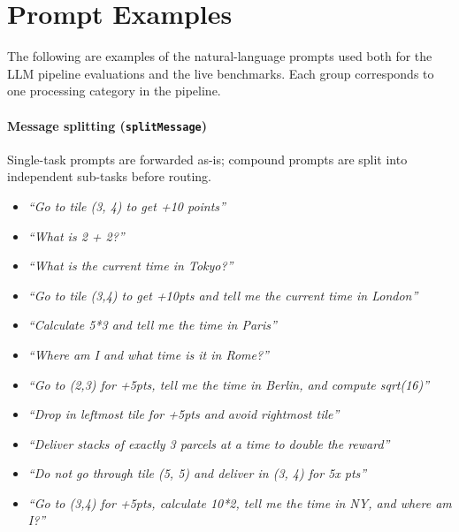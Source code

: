 \newpage
\appendix
\renewcommand{\thesection}{\Roman{section}}
\setcounter{section}{0}

\section{Prompt Examples}\label{app:prompts}

The following are examples of the natural-language prompts used both for the LLM pipeline evaluations and the live benchmarks. Each group corresponds to one processing category in the pipeline.

\paragraph{Message splitting (\texttt{splitMessage})}
Single-task prompts are forwarded as-is; compound prompts are split into independent sub-tasks before routing.
\begin{itemize}
  \item \textit{``Go to tile (3, 4) to get +10 points''}
  \item \textit{``What is 2 + 2?''}
  \item \textit{``What is the current time in Tokyo?''}
  \item \textit{``Go to tile (3,4) to get +10pts and tell me the current time in London''}
  \item \textit{``Calculate 5*3 and tell me the time in Paris''}
  \item \textit{``Where am I and what time is it in Rome?''}
  \item \textit{``Go to (2,3) for +5pts, tell me the time in Berlin, and compute sqrt(16)''}
  \item \textit{``Drop in leftmost tile for +5pts and avoid rightmost tile''}
  \item \textit{``Deliver stacks of exactly 3 parcels at a time to double the reward''}
  \item \textit{``Do not go through tile (5, 5) and deliver in (3, 4) for 5x pts''}
  \item \textit{``Go to (3,4) for +5pts, calculate 10*2, tell me the time in NY, and where am I?''}
\end{itemize}

